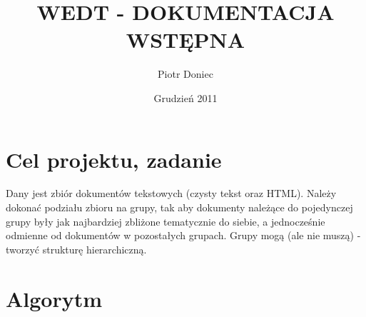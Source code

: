 \documentclass{article}
\begin{document}
\title{WEDT - DOKUMENTACJA WSTĘPNA}
\author{Piotr Doniec}
\date {Grudzień 2011}
\maketitle

\section{Cel projektu, zadanie}
Dany jest zbiór dokumentów tekstowych (czysty tekst oraz HTML). Należy dokonać podziału zbioru na grupy, tak aby dokumenty należące do pojedynczej grupy były jak najbardziej zbliżone tematycznie do siebie, a jednocześnie odmienne od dokumentów w pozostałych grupach. Grupy mogą (ale nie muszą) - tworzyć strukturę hierarchiczną. 

\section{Algorytm}
\end{document}
